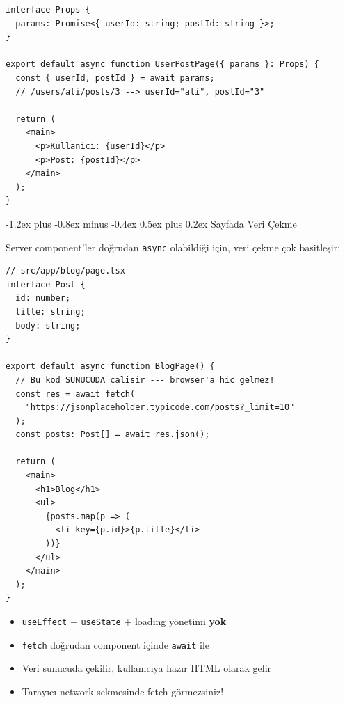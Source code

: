 \documentclass[12pt, a4paper]{article}
\makeatletter
\renewcommand{\subsection}{%
  \@startsection{subsection}{2}{\z@}%
    {-1.2ex plus -0.8ex minus -0.4ex}%
    {0.5ex plus 0.2ex}%
    {\normalfont\large\bfseries\sffamily\color{secondary}}%
}
\makeatother
\begin{document}
\begin{tcolorbox}[enhanced, colback=codebg, colframe=gray!30,
    colbacktitle=routecol!85!black, coltitle=white, arc=4pt,
    title={\sffamily\bfseries\small src/app/users/[userId]/posts/[postId]/page.tsx}]
\begin{lstlisting}[style=jsxstyle]
interface Props {
  params: Promise<{ userId: string; postId: string }>;
}

export default async function UserPostPage({ params }: Props) {
  const { userId, postId } = await params;
  // /users/ali/posts/3 --> userId="ali", postId="3"

  return (
    <main>
      <p>Kullanici: {userId}</p>
      <p>Post: {postId}</p>
    </main>
  );
}
\end{lstlisting}
\end{tcolorbox}

\vspace{6pt}

\subsection{Sayfada Veri Çekme}

Server component'ler doğrudan \texttt{async} olabildiği için, veri çekme
çok basitleşir:

\vspace{6pt}

\begin{tcolorbox}[enhanced, colback=codebg, colframe=gray!30,
    colbacktitle=ssrcol!85!black, coltitle=white, arc=4pt,
    title={\sffamily\bfseries\small Sunucu Tarafında Veri Çekme}]
\begin{lstlisting}[style=jsxstyle]
// src/app/blog/page.tsx
interface Post {
  id: number;
  title: string;
  body: string;
}

export default async function BlogPage() {
  // Bu kod SUNUCUDA calisir --- browser'a hic gelmez!
  const res = await fetch(
    "https://jsonplaceholder.typicode.com/posts?_limit=10"
  );
  const posts: Post[] = await res.json();

  return (
    <main>
      <h1>Blog</h1>
      <ul>
        {posts.map(p => (
          <li key={p.id}>{p.title}</li>
        ))}
      </ul>
    </main>
  );
}
\end{lstlisting}
\end{tcolorbox}

\vspace{6pt}

\begin{infobox}
\begin{itemize}
  \item \texttt{useEffect} + \texttt{useState} + loading yönetimi \textbf{yok}
  \item \texttt{fetch} doğrudan component içinde \texttt{await} ile
  \item Veri sunucuda çekilir, kullanıcıya hazır HTML olarak gelir
  \item Tarayıcı network sekmesinde fetch görmezsiniz!
\end{itemize}
\end{infobox}
\end{document}
